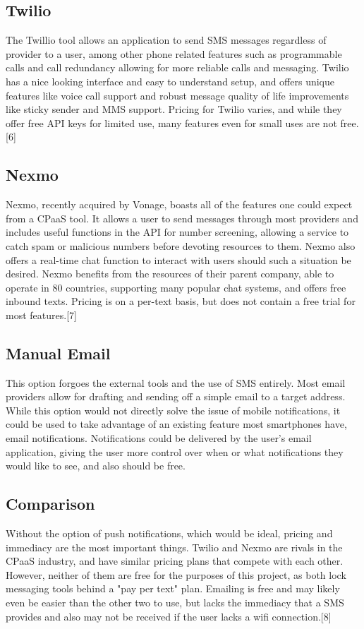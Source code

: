 \documentclass[onecolumn, draftclsnofoot,10pt, compsoc]{IEEEtran}
\begin{document}
\subsection{Twilio}
The Twillio tool allows an application to send SMS messages regardless of provider to a user, among other phone related features such as programmable calls and call redundancy allowing
for more reliable calls and messaging. Twilio has a nice looking interface and easy to understand setup, and offers unique features like voice call support and robust 
message quality of life improvements like sticky sender and MMS support. Pricing for Twilio varies, and while they offer free API keys for limited use, many features even for small uses 
are not free.[6]
\subsection{Nexmo}
Nexmo, recently acquired by Vonage, boasts all of the features one could expect from a CPaaS tool. It allows a user to send messages through most providers and includes useful functions in
the API for number screening, allowing a service to catch spam or malicious numbers before devoting resources to them. Nexmo also offers a real-time chat function to interact with users 
should such a situation be desired. Nexmo benefits from the resources of their parent company, able to operate in 80 countries, supporting many popular chat systems, and offers free inbound texts.
Pricing is on a per-text basis, but does not contain a free trial for most features.[7]
\subsection{Manual Email}
This option forgoes the external tools and the use of SMS entirely. Most email providers allow for drafting and sending off a simple email to a target address. While this option would not 
directly solve the issue of mobile notifications, it could be used to take advantage of an existing feature most smartphones have, email notifications. Notifications could be delivered by the user's 
email application, giving the user more control over when or what notifications they would like to see, and also should be free. 
\subsection{Comparison}
Without the option of push notifications, which would be ideal, pricing and immediacy are the most important things. Twilio and Nexmo are rivals in the CPaaS industry, and have similar pricing plans that
compete with each other. However, neither of them are free for the purposes of this project, as both lock messaging tools behind a "pay per text" plan. Emailing is free and may likely even be easier 
than the other two to use, but lacks the immediacy that a SMS provides and also may not be received if the user lacks a wifi connection.[8]
\end{document}
